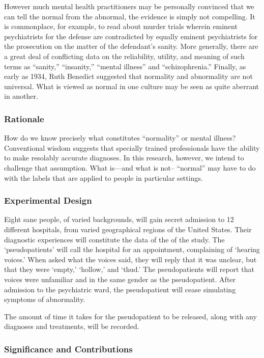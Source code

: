 However much mental health practitioners may be personally convinced that we can tell the normal from the abnormal, the evidence is simply not compelling. It is commonplace, for example, to read about murder trials wherein eminent psychiatrists for the defense are contradicted by equally eminent psychiatrists for the prosecution on the matter of the defendant's sanity. More generally, there are a great deal of conflicting data on the reliability, utility, and meaning of such terms as ``sanity,'' ``insanity,'' ``mental illness'' and ``schizophrenia.'' Finally, as early as 1934, Ruth Benedict suggested that normality and abnormality are not universal. What is viewed as normal in one culture may be seen as quite aberrant in another.

\subsubsection{Rationale}
\label{rationale}

How do we know precisely what constitutes ``normality'' or mental illness? Conventional wisdom suggests that specially trained professionals have the ability to make resolably accurate diagnoses. In this research, however, we intend to challenge that assumption. What is---and what is not-- ``normal'' may have to do with the labels that are applied to people in particular settings.

\subsubsection{Experimental Design}
\label{experimentaldesign}

Eight sane people, of varied backgrounds, will gain secret admission to 12 different hospitals, from varied geographical regions of the United States. Their diagnostic experiences will constitute the data of the of the study. The `pseudopatients' will call the hospital for an appointment, complaining of `hearing voices.' When asked what the voices said, they will reply that it was unclear, but that they were `empty,' `hollow,' and `thud.' The pseudopatients will report that voices were unfamiliar and in the same gender as the pseudopatient. After admission to the psychiatric ward, the pseudopatient will cease simulating symptoms of abnormality. 

The amount of time it takes for the pseudopatient to be released, along with any diagnoses and treatments, will be recorded.

\subsubsection{Significance and Contributions}
\label{significanceandcontributions}

